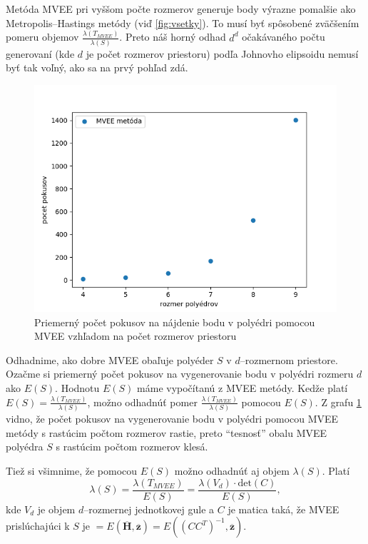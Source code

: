 Metóda MVEE pri vyššom počte rozmerov generuje body výrazne pomalšie ako Metropolis--Hastings metódy (viď \ref{fig:vsetky}).
To musí byť spôsobené zväčšením pomeru objemov $\frac{\lambda(T_{MVEE})}{\lambda(S)}$. Preto náš horný odhad $d^d$ očakávaného počtu generovaní (kde $d$ je počet rozmerov priestoru) podľa Johnovho elipsoidu nemusí byť tak voľný, ako sa na prvý pohľad zdá.\\

\begin{figure} [H]
	\includegraphics[width=\linewidth]{images/mvee_pokusy.png}
	\caption{Priemerný počet pokusov na nájdenie bodu v polyédri pomocou MVEE vzhľadom na počet rozmerov priestoru}
	\label{fig:mvee_pokusy}
\end{figure}

Odhadnime, ako dobre MVEE obaľuje polyéder $S$ v $d$--rozmernom priestore. Ozačme si priemerný počet pokusov na vygenerovanie bodu v polyédri rozmeru $d$ ako $E(S)$. Hodnotu $E(S)$ máme vypočítanú z MVEE metódy. Kedže platí $E(S)=\frac{\lambda(T_{MVEE})}{\lambda(S)}$, možno odhadnúť pomer $\frac{\lambda(T_{MVEE})}{\lambda(S)}$ pomocou $E(S)$. Z grafu \ref{fig:mvee_pokusy} vidno, že počet pokusov na vygenerovanie bodu v polyédri pomocou MVEE metódy s rastúcim počtom rozmerov rastie, preto ``tesnosť'' obalu MVEE polyédra $S$ s rastúcim počtom rozmerov klesá.

Tiež si všimnime, že pomocou $E(S)$ možno odhadnúť aj objem $\lambda(S)$. Platí $$\lambda(S)=\frac{\lambda(T_{MVEE})}{E(S)}=\frac{\lambda(V_d) \cdot \text{det}(C)}{E(S)},$$ kde $V_d$ je objem $d$--rozmernej jednotkovej gule a $C$ je matica taká, že MVEE prislúchajúci k $S$ je $=E(\mathbf{\overline H, \overline z})=E((CC^T)^{-1}, \mathbf{ \overline z})$.

